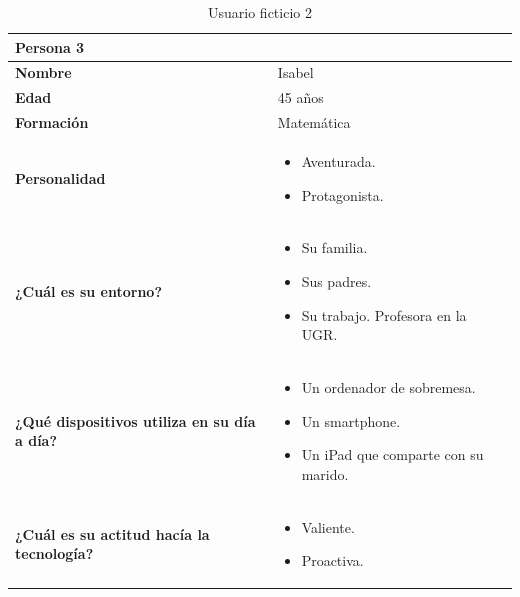 \begin{table}[H]
   \begin{center}
      \begin{tabular}{| p{} | p{} |}
         \hline
         Persona 3 &  \\ \hline
         \textbf{Nombre} & Isabel \\
         \textbf{Edad} & 45 años \\
         \textbf{Formación} & Matemática \\
         \textbf{Personalidad} & \begin{itemize}
                \item Aventurada.
                \item Protagonista. \end{itemize} \\
         \textbf{¿Cuál es su entorno?} & \begin{itemize}
                \item Su familia.
                \item Sus padres.
                \item Su trabajo. Profesora en la UGR. \end{itemize} \\
         \textbf{¿Qué dispositivos utiliza en su día a día?} & \begin{itemize}
                \item Un ordenador de sobremesa.
                \item Un smartphone.
                \item Un iPad que comparte con su marido. \end{itemize} \\
            \textbf{¿Cuál es su actitud hacía la tecnología?} & \begin{itemize}
                \item Valiente.
                \item Proactiva. \end{itemize} \\
            \hline
      \end{tabular}
      \caption{Usuario ficticio 2}
   \end{center}
\end{table}
